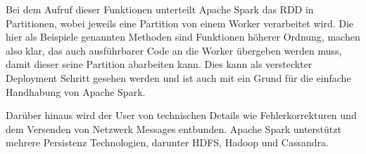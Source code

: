 Bei dem Aufruf dieser Funktionen unterteilt Apache Spark das RDD in Partitionen, wobei jeweils eine Partition von einem Worker verarbeitet wird.
Die hier als Beispiele genannten Methoden sind Funktionen höherer Ordnung, machen also klar, das auch ausführbarer Code an die Worker übergeben werden muss, damit dieser seine Partition abarbeiten kann.
Dies kann als versteckter Deployment Schritt gesehen werden und ist auch mit ein Grund für die einfache Handhabung von Apache Spark.

Darüber hinaus wird der User von technischen Details wie Fehlerkorrekturen und dem Versenden von Netzwerk Messages entbunden.
Apache  Spark unterstützt mehrere Persistenz Technologien, darunter HDFS, Hadoop und Cassandra.
